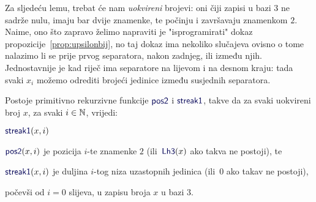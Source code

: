 Za sljedeću lemu, trebat će nam \emph{uokvireni} brojevi: oni čiji zapisi u bazi $3$ ne sadrže nulu, imaju bar dvije znamenke, te počinju i završavaju znamenkom $2$. Naime, ono što zapravo želimo napraviti je "isprogramirati" dokaz propozicije~\ref{prop:upsilonbij}, no taj dokaz ima nekoliko slučajeva ovisno o tome nalazimo li se prije prvog separatora, nakon zadnjeg, ili između njih. Jednostavnije je kad riječ ima separatore na lijevom i na desnom kraju: tada svaki $x_i$ možemo odrediti brojeći jedinice između susjednih separatora.

\begin{lema}\label{lm:pos2streak1prn}
Postoje primitivno rekurzivne funkcije $\f{pos2}$ i $\f{streak1}$, takve da za svaki uokvireni broj $x$, za svaki $i\in{\mathbb N}$, vrijedi:
\begin{labeling}{$\f{streak1}(x,i)$}
    \item[$\f{pos2}(x,i)$] je pozicija $i$-te znamenke $2$ (ili\, $\f{Lh3}(x)$ ako takva ne postoji), te
    \item[$\f{streak1}(x,i)$] je duljina $i$-tog niza uzastopnih jedinica (ili\, $0$ ako takav ne postoji),
\end{labeling}
počevši od $i=0$ slijeva, u zapisu broja $x$ u bazi $3$.
\end{lema}
